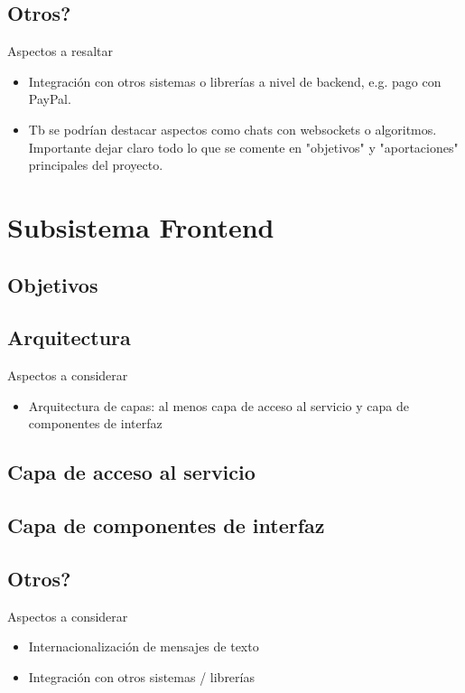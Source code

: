 \subsection{Otros?}

{ \color{red} Aspectos a resaltar
    \begin{itemize}
      \item Integración con otros sistemas o librerías a nivel de backend, e.g. pago con PayPal. 
      \item Tb se podrían destacar aspectos como chats con websockets o algoritmos. Importante dejar claro todo lo que se comente en "objetivos" y "aportaciones" principales del proyecto.
    \end{itemize}
}

\section{Subsistema Frontend}

\subsection{Objetivos}

\subsection{Arquitectura}

{ \color{red} Aspectos a considerar
    \begin{itemize}
      \item Arquitectura de capas: al menos capa de acceso al servicio y capa de componentes de interfaz
    \end{itemize}
}

\subsection{Capa de acceso al servicio}

\subsection{Capa de componentes de interfaz}

\subsection{Otros?}

{ \color{red} Aspectos a considerar
    \begin{itemize}
      \item Internacionalización de mensajes de texto 
      \item Integración con otros sistemas / librerías
    \end{itemize}
}
